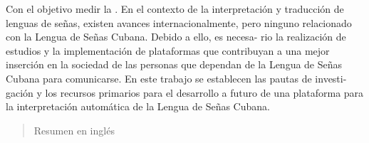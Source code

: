 \begin{resumen}
	Con el objetivo medir la . En el contexto de la interpretación y traducción de lenguas de señas, existen avances internacionalmente, pero ninguno relacionado con la Lengua de Señas Cubana. Debido a ello, es necesa- rio la realización de estudios y la implementación de plataformas que contribuyan a una mejor inserción en la sociedad de las personas que dependan de la Lengua de Señas Cubana para comunicarse. En este trabajo se establecen las pautas de investi- gación y los recursos primarios para el desarrollo a futuro de una plataforma para la interpretación automática de la Lengua de Señas Cubana.
\end{resumen}

\begin{abstract}
	Resumen en inglés
\end{abstract}